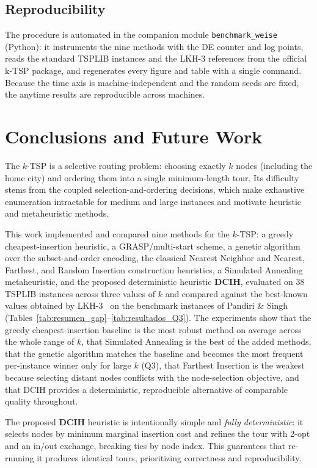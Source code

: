 \documentclass[conference]{IEEEtran}
\begin{document}
\subsection{Reproducibility}
The procedure is automated in the companion module \texttt{benchmark\_weise}
(Python): it instruments the nine methods with the DE counter and log points, reads
the standard TSPLIB instances and the LKH-3 references from the official k-TSP
package, and regenerates every figure and table with a single command. Because the
time axis is machine-independent and the random seeds are fixed, the anytime
results are reproducible across machines.

\section{Conclusions and Future Work}
The $k$-TSP is a selective routing problem: choosing exactly $k$ nodes (including the home city) and ordering them into a single minimum-length tour. Its difficulty stems from the coupled selection-and-ordering decisions, which make exhaustive enumeration intractable for medium and large instances and motivate heuristic and metaheuristic methods.

This work implemented and compared nine methods for the $k$-TSP: a greedy cheapest-insertion heuristic, a GRASP/multi-start scheme, a genetic algorithm over the subset-and-order encoding, the classical Nearest Neighbor and Nearest, Farthest, and Random Insertion construction heuristics, a Simulated Annealing metaheuristic, and the proposed deterministic heuristic \textbf{DCIH}, evaluated on 38 TSPLIB instances across three values of $k$ and compared against the best-known values obtained by LKH-3~\cite{Helsgaun} on the benchmark instances of Pandiri \& Singh~\cite{pandiri2020} (Tables~\ref{tab:resumen_gap}--\ref{tab:resultados_Q3}). The experiments show that the greedy cheapest-insertion baseline is the most robust method on average across the whole range of $k$, that Simulated Annealing is the best of the added methods, that the genetic algorithm matches the baseline and becomes the most frequent per-instance winner only for large $k$ (Q3), that Farthest Insertion is the weakest because selecting distant nodes conflicts with the node-selection objective, and that DCIH provides a deterministic, reproducible alternative of comparable quality throughout.

The proposed \textbf{DCIH} heuristic is intentionally simple and \emph{fully deterministic}: it selects nodes by minimum marginal insertion cost and refines the tour with 2-opt and an in/out exchange, breaking ties by node index. This guarantees that re-running it produces identical tours, prioritizing correctness and reproducibility.
\end{document}
